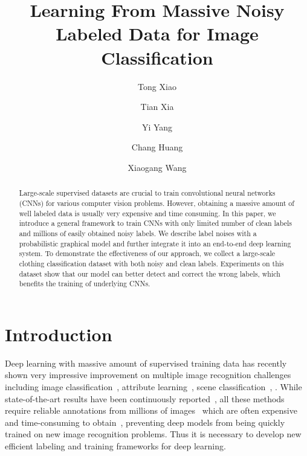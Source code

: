 \documentclass[10pt,twocolumn,letterpaper]{article}
\begin{document}

\title{Learning From Massive Noisy Labeled Data for Image Classification}

\author[1]{Tong Xiao}
\author[2]{Tian Xia}
\author[2]{Yi Yang}
\author[2]{Chang Huang}
\author[1]{Xiaogang Wang}


\renewcommand\Authands{ and }


\maketitle

\begin{abstract}
Large-scale supervised datasets are crucial to train convolutional neural networks (CNNs) for various computer vision problems. However, obtaining a massive amount of well labeled data is usually very expensive and time consuming. In this paper, we introduce a general framework to train CNNs with only limited number of clean labels and millions of easily obtained noisy labels. We describe label noises with a probabilistic graphical model and further integrate it into an end-to-end deep learning system. To demonstrate the effectiveness of our approach, we collect a large-scale clothing classification dataset with both noisy and clean labels. Experiments on this dataset show that our model can better detect and correct the wrong labels, which benefits the training of underlying CNNs.
\end{abstract}

\section{Introduction} %
\label{sec:introduction}

Deep learning with massive amount of supervised training data has recently shown very impressive improvement on multiple image recognition challenges including image classification~\cite{krizhevsky2012imagenet}, attribute learning~\cite{zhang2013panda}, scene classification~\cite{farabet2013learning}, \etc. While state-of-the-art results have been continuously reported~\cite{zeiler2013visualizing,simonyan2014very,szegedy2014going}, all these methods require reliable annotations from millions of images~\cite{deng2009imagenet} which are often expensive and time-consuming to obtain~\cite{deng2009imagenet}, preventing deep models from being quickly trained on new image recognition problems. Thus it is necessary to develop new efficient labeling and training frameworks for deep learning.
\end{document}
